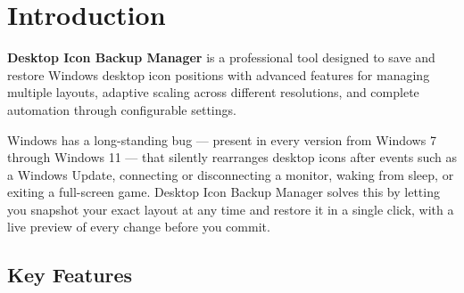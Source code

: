 \documentclass[a4paper,11pt]{article}
\begin{document}
\section{Introduction}

\textbf{Desktop Icon Backup Manager} is a professional tool designed
to save and restore Windows desktop icon positions with advanced
features for managing multiple layouts, adaptive scaling across
different resolutions, and complete automation through configurable settings.

Windows has a long-standing bug --- present in every version from
Windows 7 through Windows 11 --- that silently rearranges desktop
icons after events such as a Windows Update, connecting or
disconnecting a monitor, waking from sleep, or exiting a full-screen
game. Desktop Icon Backup Manager solves this by letting you snapshot
your exact layout at any time and restore it in a single click,
with a live preview of every change before you commit.

\subsection{Key Features}
\end{document}
